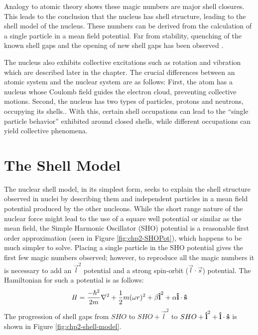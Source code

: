 Analogy to atomic theory shows these magic numbers are major shell closures. This leads to the conclusion that the nucleus has shell structure, leading to the shell model of the nucleus. These numbers can be derived from the calculation of a single particle in a mean field potential. Far from stability, quenching of the known shell gaps and the opening of new shell gaps has been observed \cite{changingShells}.

The nucleus also exhibits collective excitations such as rotation and vibration which are described later in the chapter. The crucial differences between an atomic system and the nuclear system are as follows: First, the atom has a nucleus whose Coulomb field guides the electron cloud, preventing collective motions. Second, the nucleus has two types of particles, protons and neutrons, occupying its shells.. With this, certain shell occupations can lead to the ``single particle behavior'' exhibited around closed shells, while different occupations can yield collective phenomena.

\section{The Shell Model}
\label{sec:models-shell-model}
The nuclear shell model, in its simplest form, seeks to explain the shell structure observed in nuclei by describing them and independent particles in a mean field potential produced by the other nucleons. While the short range nature of the nuclear force might lead to the use of a square well potential or similar as the mean field, the Simple Harmonic Oscillator (SHO) potential is a reasonable first order approximation (seen in Figure \ref{fig:chp2-SHOPot}), which happens to be much simpler to solve. Placing a single particle in the SHO potential gives the first few magic numbers observed; however, to reproduce all the magic numbers it is necessary to add an $\vec{l}^2$ potential and a strong spin-orbit ($\vec{l}\cdot\vec{s}$) potential. The Hamiltonian for such a potential is as follows:
\begin{equation}
\label{eqn:chp2-sm-sho-hamil}
\mathbf{\mathit{H}} = \frac{-\hbar^2}{2m}\nabla^2 + \frac{1}{2}m(\omega r)^2 + \beta \boldsymbol{\hat{\textbf{l}}}^2 + \alpha \boldsymbol{\hat{\textbf{l}}}\cdot{}\boldsymbol{\hat{\textbf{s}}}
\end{equation}
The progression of shell gaps from $SHO$ to $SHO + \vec{l}^2$ to $SHO + \boldsymbol{\hat{\textbf{l}}}^2 + \boldsymbol{\hat{\textbf{l}}}\cdot\boldsymbol{\hat{\textbf{s}}}$ is shown in Figure \ref{fig:chp2-shell-model}.

